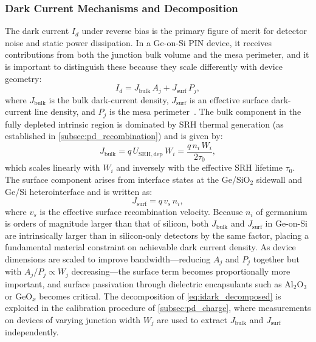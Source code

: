 \subsubsection[Dark Current Mechanisms and Decomposition]{Dark Current Mechanisms and Decomposition}
\label{subsubsec:pd_idark}

The dark current $I_d$ under reverse bias is the primary figure of merit for
detector noise and static power dissipation. In a Ge-on-Si PIN device, it
receives contributions from both the junction bulk volume and the mesa
perimeter, and it is important to distinguish these because they scale
differently with device geometry:
\begin{equation}
    I_d = J_{\mathrm{bulk}}\,A_j + J_{\mathrm{surf}}\,P_j,
    \label{eq:idark_decomposed}
\end{equation}
where $J_{\mathrm{bulk}}$ is the bulk dark-current density, $J_{\mathrm{surf}}$
is an effective surface dark-current line density, and $P_j$ is the mesa
perimeter~\cite{SzeNg2006}. The bulk component in the fully depleted intrinsic
region is dominated by SRH thermal generation (as established in
\cref{subsec:pd_recombination}) and is given by:
\begin{equation}
    J_{\mathrm{bulk}}
    = q\,U_{\mathrm{SRH,dep}}\,W_i
    = \frac{q\,n_i\,W_i}{2\tau_0},
    \label{eq:jdark_bulk}
\end{equation}
which scales linearly with $W_i$ and inversely with the effective SRH lifetime
$\tau_0$. The surface component arises from interface states at the Ge/SiO$_2$
sidewall and Ge/Si heterointerface and is written as:
\begin{equation}
    J_{\mathrm{surf}}
    = q\,v_s\,n_i,
    \label{eq:jdark_surf}
\end{equation}
where $v_s$ is the effective surface recombination velocity. Because $n_i$ of
germanium is orders of magnitude larger than that of silicon, both
$J_{\mathrm{bulk}}$ and $J_{\mathrm{surf}}$ in Ge-on-Si are intrinsically
larger than in silicon-only detectors by the same factor, placing a fundamental
material constraint on achievable dark current density. As device dimensions
are scaled to improve bandwidth---reducing $A_j$ and $P_j$ together but with
$A_j/P_j \propto W_j$ decreasing---the surface term becomes proportionally
more important, and surface passivation through dielectric encapsulants such as
Al$_2$O$_3$ or GeO$_x$ becomes critical. The decomposition of \cref{eq:idark_decomposed}
is exploited in the calibration procedure of \cref{subsec:pd_charge}, where
measurements on devices of varying junction width $W_j$ are used to extract
$J_{\mathrm{bulk}}$ and $J_{\mathrm{surf}}$ independently.

